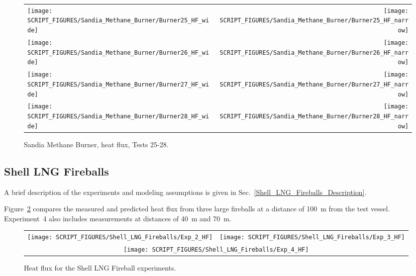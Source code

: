 \begin{figure}[p]
\begin{tabular*}{\textwidth}{l@{\extracolsep{\fill}}r}
\texttt{[image: SCRIPT\_FIGURES/Sandia\_Methane\_Burner/Burner25\_HF\_wide]} &
\texttt{[image: SCRIPT\_FIGURES/Sandia\_Methane\_Burner/Burner25\_HF\_narrow]} \\
\texttt{[image: SCRIPT\_FIGURES/Sandia\_Methane\_Burner/Burner26\_HF\_wide]} &
\texttt{[image: SCRIPT\_FIGURES/Sandia\_Methane\_Burner/Burner26\_HF\_narrow]} \\
\texttt{[image: SCRIPT\_FIGURES/Sandia\_Methane\_Burner/Burner27\_HF\_wide]} &
\texttt{[image: SCRIPT\_FIGURES/Sandia\_Methane\_Burner/Burner27\_HF\_narrow]} \\
\texttt{[image: SCRIPT\_FIGURES/Sandia\_Methane\_Burner/Burner28\_HF\_wide]} &
\texttt{[image: SCRIPT\_FIGURES/Sandia\_Methane\_Burner/Burner28\_HF\_narrow]}
\end{tabular*}
\caption[Sandia Methane Burner, heat flux, Tests 25-28] {Sandia Methane Burner, heat flux, Tests 25-28.}
\label{Sandia_Methane_Burner_HF_7}
\end{figure}

\clearpage

\subsection{Shell LNG Fireballs}
\label{Shell_LNG_Fireballs_Heat_Flux}

A brief description of the experiments and modeling assumptions is given in Sec.~\ref{Shell_LNG_Fireballs_Description}.

Figure~\ref{Shell_HF} compares the measured and predicted heat flux from three large fireballs at a distance of 100~m from the test vessel. Experiment~4 also includes measurements at distances of 40~m and 70~m.

\begin{figure}[!ht]
\begin{tabular*}{\textwidth}{l@{\extracolsep{\fill}}r}
\texttt{[image: SCRIPT\_FIGURES/Shell\_LNG\_Fireballs/Exp\_2\_HF]} &
\texttt{[image: SCRIPT\_FIGURES/Shell\_LNG\_Fireballs/Exp\_3\_HF]} \\
\multicolumn{2}{c}{\texttt{[image: SCRIPT\_FIGURES/Shell\_LNG\_Fireballs/Exp\_4\_HF]}}
\end{tabular*}
\caption[Shell LNG Fireballs, heat flux] {Heat flux for the Shell LNG Fireball experiments.}
\label{Shell_HF}
\end{figure}

